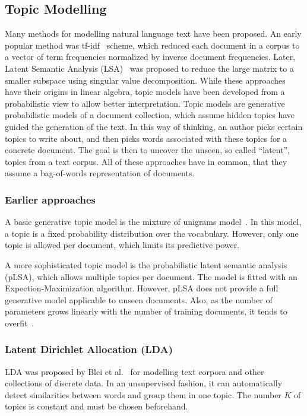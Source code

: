 \documentclass{sig-alternate-05-2015}
\begin{document}
\subsection{Topic Modelling}

Many methods for modelling natural language text have been proposed.
An early popular method was tf-idf~\cite{SparckJones1972} scheme, which reduced each document in a corpus to a vector of term frequencies normalized by inverse document frequencies.
Later, Latent Semantic Analysis (LSA)~\cite{Deerwester1990} was proposed to reduce the large matrix to a smaller subspace using singular value decomposition.
While these approaches have their origins in linear algebra, topic models have been developed from a probabilistic view to allow better interpretation.
Topic models are generative probabilistic models of a document collection, which assume hidden topics have guided the generation of the text.
In this way of thinking, an author picks certain topics to write about, and then picks words associated with these topics for a concrete document.
The goal is then to uncover the unseen, so called ``latent'', topics from a text corpus.
All of these approaches have in common, that they assume a bag-of-words representation of documents.

\subsubsection{Earlier approaches}
A basic generative topic model is the mixture of unigrams model~\cite{Nigam2000}.
In this model, a topic is a fixed probability distribution over the vocabulary.
However, only one topic is allowed per document, which limits its predictive power.

A more sophisticated topic model is the probabilistic latent semantic analysis (pLSA), which allows multiple topics per document.
The model is fitted with an Expection-Maximization algorithm.
However, pLSA does not provide a full generative model applicable to unseen documents.
Also, as the number of parameters grows linearly with the number of training documents, it tends to overfit~\cite{Blei2003}.

\subsubsection{Latent Dirichlet Allocation (LDA)}
LDA was proposed by Blei et al.~\cite{Blei2003} for modelling text corpora and other collections of discrete data.
In an unsupervised fashion, it can automatically detect similarities between words and group them in one topic.
The number $K$ of topics is constant and must be chosen beforehand.
\end{document}

